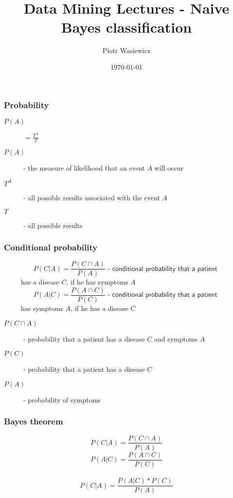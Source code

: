 \documentclass[proffesionalfonts]{beamer}
\title[EARIN]{Data Mining Lectures - Naive Bayes classification}
\author{Piotr Wasiewicz}
\institute[ICS PW]
{
Institute of Computer Science\\
\medskip
{\emph{pwasiewi@elka.pw.edu.pl}}
}
\date{\today}
\newcommand{\faup}{ }
\begin{document}
\begin{frame}
\titlepage
\end{frame}

\begin{frame}
\frametitle{Probability}
\begin{center}
\large
\begin{description}
\item[$P(A)$]$= \frac{T^A}{T}$
\item[$P(A)$] - the measure of likelihood that an event $A$ will occur
\item[$T^A$] - all possible results associated with the event $A$
\item[$T$] - all possible results 
\end{description}
\normalsize
\end{center}
\end{frame}

\begin{frame}\frametitle{Conditional probability}
\large
\[P(C|A)=\frac{P(C\cap A)}{P(A)}\textsf{\faup\ \ - conditional probability that a patient }\] 
\ \ \ \ \ has a disease $C$, if he has symptoms $A$
\[P(A|C)=\frac{P(A\cap C)}{P(C)}\textsf{\faup\ \  - conditional probability that a patient }\]
\ \ \ \ \ has symptoms $A$, if he has a disease $C$
\begin{description}
\item[$P(C\cap A)$] - probability that a patient has a disease $C$ and symptoms $A$
\item[$P(C)$] - probability that a patient has a disease $C$
\item[$P(A)$] - probability of symptoms
\end{description}
\normalsize
\end{frame}

\begin{frame}\frametitle{Bayes theorem}
\begin{center}
\large
\[P(C|A)=\frac{P(C\cap A)}{P(A)}\]  
\[P(A|C)=\frac{P(A\cap C)}{P(C)}\]\\
\Large
\[P(C|A)=\frac{P(A|C)*P(C)}{P(A)}\]
\normalsize
\end{center}
\end{frame}
\end{document}
